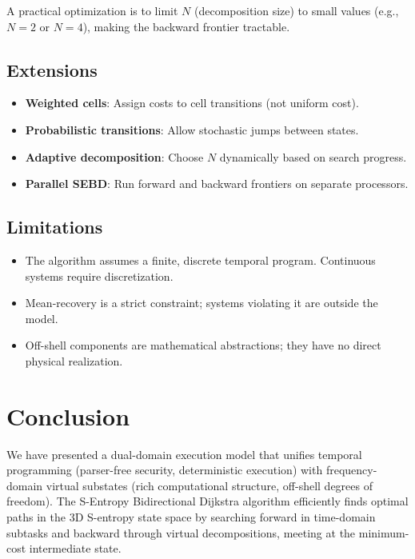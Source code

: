 \documentclass[twocolumn,11pt,a4paper]{article}
\begin{document}
A practical optimization is to limit $N$ (decomposition size) to small values (e.g., $N = 2$ or $N = 4$), making the backward frontier tractable.

\subsection{Extensions}

\begin{itemize}[nosep,leftmargin=1em]
  \item \textbf{Weighted cells}: Assign costs to cell transitions (not uniform cost).
  \item \textbf{Probabilistic transitions}: Allow stochastic jumps between states.
  \item \textbf{Adaptive decomposition}: Choose $N$ dynamically based on search progress.
  \item \textbf{Parallel SEBD}: Run forward and backward frontiers on separate processors.
\end{itemize}

\subsection{Limitations}

\begin{itemize}[nosep,leftmargin=1em]
  \item The algorithm assumes a finite, discrete temporal program. Continuous systems require discretization.
  \item Mean-recovery is a strict constraint; systems violating it are outside the model.
  \item Off-shell components are mathematical abstractions; they have no direct physical realization.
\end{itemize}

\section{Conclusion}
\label{sec:conclusion}

We have presented a dual-domain execution model that unifies temporal programming (parser-free security, deterministic execution) with frequency-domain virtual substates (rich computational structure, off-shell degrees of freedom). The S-Entropy Bidirectional Dijkstra algorithm efficiently finds optimal paths in the 3D S-entropy state space by searching forward in time-domain subtasks and backward through virtual decompositions, meeting at the minimum-cost intermediate state.
\end{document}
